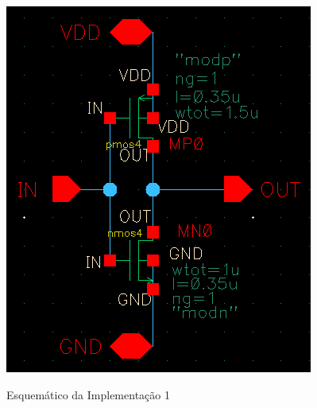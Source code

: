 \documentclass{iiufrgs}
\begin{document}
\begin{figure}[htbp]
    \centering
    \caption{Esquemático da Implementação 1}
    \includegraphics[scale=0.8]{images/esquematico1.png}
    \label{fig:esquematico1}
\end{figure}
\end{document}
